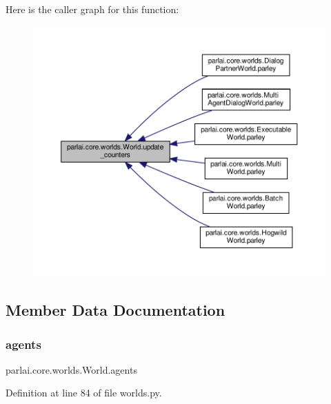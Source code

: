 Here is the caller graph for this function\+:
\nopagebreak
\begin{figure}[H]
\begin{center}
\leavevmode
\includegraphics[width=350pt]{classparlai_1_1core_1_1worlds_1_1World_a77730e92a331274ab7b6ea3e7b99d1a4_icgraph}
\end{center}
\end{figure}


\subsection{Member Data Documentation}
\mbox{\label{classparlai_1_1core_1_1worlds_1_1World_a728f75194cc26ea4035047c46cf62608}} 
\subsubsection{\texorpdfstring{agents}{agents}}
{\footnotesize\ttfamily parlai.\+core.\+worlds.\+World.\+agents}



Definition at line 84 of file worlds.\+py.



